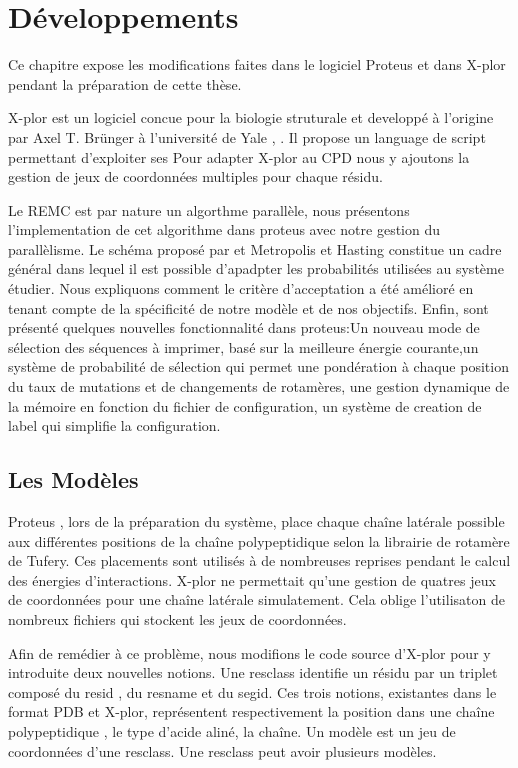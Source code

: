 \chapter{Développements}
\label{chap:developpements}

Ce chapitre expose les modifications faites dans le logiciel Proteus et dans X-plor pendant la préparation de cette thèse.

X-plor est un logiciel concue pour la biologie struturale et developpé à l'origine par Axel T. Brünger à l'université de Yale , \cite{Brünger92}. Il propose un language de script permettant d'exploiter ses Pour adapter X-plor au CPD nous y ajoutons la gestion de jeux de coordonnées multiples pour chaque résidu.

Le REMC est par nature un algorthme parallèle, nous présentons l'implementation de cet algorithme dans proteus avec notre gestion du parallèlisme. Le schéma proposé par et Metropolis et Hasting constitue un cadre général dans lequel il est possible d'apadpter les probabilités utilisées au système étudier. Nous expliquons comment le critère d'acceptation a été amélioré en tenant compte de la spécificité de notre modèle et de nos objectifs. Enfin, sont présenté quelques nouvelles fonctionnalité dans proteus:Un nouveau mode de sélection des séquences à imprimer, basé sur la meilleure énergie courante,un système de probabilité de sélection qui permet une pondération à chaque position du taux de mutations et de changements de rotamères, une gestion dynamique de la mémoire en fonction du fichier de configuration, un système de creation de label qui simplifie la configuration.  


\section{Les Modèles }

Proteus , lors de la préparation du système, place chaque chaîne latérale possible aux différentes positions de la chaîne polypeptidique selon la librairie de rotamère de Tufery. Ces placements sont utilisés à de nombreuses reprises pendant le calcul des énergies d'interactions. X-plor ne permettait qu'une gestion de quatres jeux de coordonnées pour une chaîne latérale simulatement. Cela oblige l'utilisaton de nombreux fichiers qui stockent les jeux de coordonnées.

Afin de remédier à ce problème, nous modifions le code source d'X-plor pour y introduite deux nouvelles notions. Une resclass identifie un résidu par un triplet composé du resid , du resname et du segid. Ces trois notions, existantes dans le format PDB et X-plor, représentent respectivement la position dans une chaîne polypeptidique , le type d'acide aliné, la chaîne. Un modèle est un jeu de coordonnées d'une resclass. Une resclass peut avoir plusieurs modèles.



